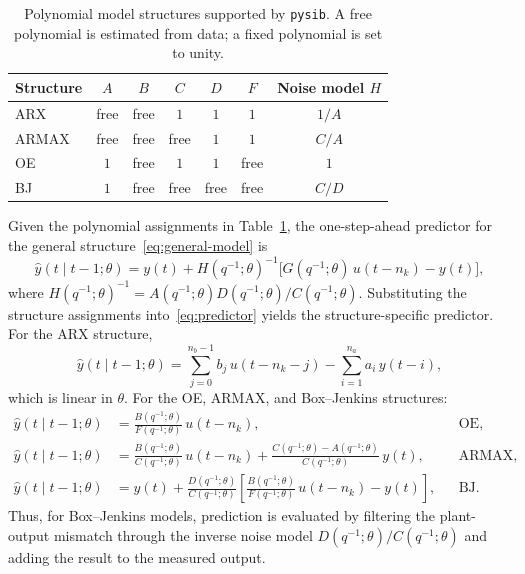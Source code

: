 \documentclass{ifacconf}
\begin{document}
\begin{table}[t]
    \caption{Polynomial model structures supported by \texttt{pysib}.
             A free polynomial is estimated from data; a fixed polynomial
             is set to unity.}
    \label{tab:structures}
    \centering
    \footnotesize
    \setlength{\tabcolsep}{4pt}
    \begin{tabular}{lcccccc}
        \toprule
        Structure & $A$ & $B$ & $C$ & $D$ & $F$ & Noise model $H$ \\
        \midrule
        ARX   & free & free & $1$ & $1$ & $1$ & $1/A$ \\
        ARMAX & free & free & free & $1$ & $1$ & $C/A$ \\
        OE    & $1$  & free & $1$ & $1$ & free & $1$ \\
        BJ    & $1$  & free & free & free & free & $C/D$ \\
        \bottomrule
    \end{tabular}
\end{table}

Given the polynomial assignments in Table~\ref{tab:structures}, the
one-step-ahead predictor for the general structure~\eqref{eq:general-model} is
\begin{equation}
    \hat{y}(t \mid t-1;\theta) =
    y(t) + H(q^{-1};\theta)^{-1}
    \bigl[G(q^{-1};\theta)\,u(t-n_k) - y(t)\bigr],
    \label{eq:predictor}
\end{equation}
where $H(q^{-1};\theta)^{-1} = A(q^{-1};\theta)D(q^{-1};\theta)/C(q^{-1};\theta)$.
Substituting the structure assignments into~\eqref{eq:predictor} yields the
structure-specific predictor.  For the ARX structure,
\begin{equation}
    \hat{y}(t \mid t-1;\theta) =
    \sum_{j=0}^{n_b-1} b_j\,u(t-n_k-j)
    - \sum_{i=1}^{n_a} a_i\,y(t-i),
    \label{eq:arx-predictor}
\end{equation}
which is linear in $\theta$.
For the OE, ARMAX, and Box--Jenkins structures:
\begin{align}
    \hat{y}(t \mid t-1;\theta) &= \frac{B(q^{-1};\theta)}{F(q^{-1};\theta)}\,u(t-n_k),
    && \text{OE}, \label{eq:oe-predictor}\\
    \hat{y}(t \mid t-1;\theta) &= \frac{B(q^{-1};\theta)}{C(q^{-1};\theta)}\,u(t-n_k)
    + \frac{C(q^{-1};\theta)-A(q^{-1};\theta)}{C(q^{-1};\theta)}\,y(t),
    && \text{ARMAX}, \label{eq:armax-predictor}\\
    \hat{y}(t \mid t-1;\theta) &= y(t)
    + \frac{D(q^{-1};\theta)}{C(q^{-1};\theta)}
    \left[\frac{B(q^{-1};\theta)}{F(q^{-1};\theta)}\,u(t-n_k) - y(t)\right],
    && \text{BJ}. \label{eq:bj-predictor}
\end{align}
Thus, for Box--Jenkins models, prediction is evaluated by filtering the
plant-output mismatch through the inverse noise model $D(q^{-1};\theta)/C(q^{-1};\theta)$
and adding the result to the measured output.
\end{document}
